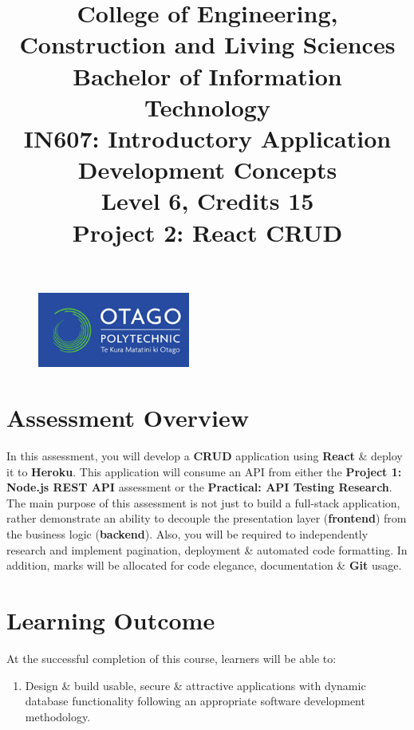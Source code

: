 \documentclass{article}
\author{}
\begin{document}
\begin{figure}
    \centering
    \includegraphics[width=50mm]{../img/logo.png}
\end{figure}

\title{College of Engineering, Construction and Living Sciences\\Bachelor of Information Technology\\IN607: Introductory Application Development Concepts\\Level 6, Credits 15\\\textbf{Project 2: React CRUD}}
\date{}
\maketitle

\section*{Assessment Overview}
In this assessment, you will develop a \textbf{CRUD} application using \textbf{React} \& deploy it to \textbf{Heroku}. This application will consume an API from either the \textbf{Project 1: Node.js REST API} assessment or the \textbf{Practical: API Testing Research}. The main purpose of this assessment is not just to build a full-stack application, rather demonstrate an ability to decouple the presentation layer (\textbf{frontend}) from the business logic (\textbf{backend}). Also, you will be required to independently research and implement pagination, deployment \& automated code formatting. In addition, marks will be allocated for code elegance, documentation \& \textbf{Git} usage.

\section*{Learning Outcome}
At the successful completion of this course, learners will be able to:
\begin{enumerate}
    \item Design \& build usable, secure \& attractive applications with dynamic database functionality following an appropriate software development methodology.
\end{enumerate}
\end{document}
